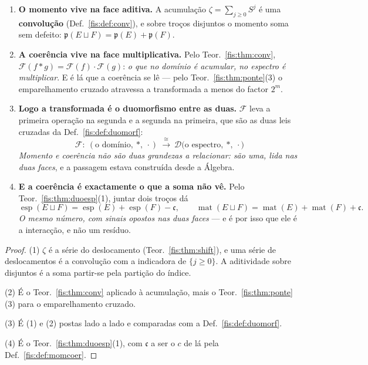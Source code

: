 \documentclass[livro.tex]{subfiles}
\begin{document}
\begin{teorema}\label{fis:thm:momcoer}
\begin{enumerate}\itemsep3pt
\item[(1)] \textbf{O momento vive na face aditiva.} A acumulação
$\zeta=\sum_{j\ge0}S^{j}$ é uma \textbf{convolução} (Def.~\ref{fis:def:conv}), e
sobre troços disjuntos o momento soma sem defeito:
$\mathfrak{p}(E\sqcup F)=\mathfrak{p}(E)+\mathfrak{p}(F)$.
\item[(2)] \textbf{A coerência vive na face multiplicativa.} Pelo
Teor.~\ref{fis:thm:conv}, $\mathcal{F}(f*g)=\mathcal{F}(f)\cdot\mathcal{F}(g)$:
\emph{o que no domínio é acumular, no espectro é multiplicar}. E é lá que a
coerência se lê --- pelo Teor.~\ref{fis:thm:ponte}(3) o emparelhamento cruzado
atravessa a transformada a menos do factor $2^{m}$.
\item[(3)] \textbf{Logo a transformada é o duomorfismo entre as duas.}
$\mathcal{F}$ leva a primeira operação na segunda e a segunda na primeira, que
são as duas leis cruzadas da Def.~\ref{fis:def:duomorf}:
\[
\boxed{\;\mathcal{F}\colon\ (\text{o domínio},\ \ast,\ \cdot)\ \xrightarrow{\ \cong\ }\ \mathcal{D}\bigl(\text{o espectro},\ \ast,\ \cdot\bigr)\;}
\]
\emph{Momento e coerência não são duas grandezas a relacionar: são uma, lida nas
duas faces}, e a passagem estava construída desde a Álgebra.
\item[(4)] \textbf{E a coerência é exactamente o que a soma não vê.} Pelo
Teor.~\ref{fis:thm:duoesp}(1), juntar dois troços dá
\[
\operatorname{esp}(E\sqcup F)=\operatorname{esp}(E)+\operatorname{esp}(F)-\mathfrak{c},
\qquad
\operatorname{mat}(E\sqcup F)=\operatorname{mat}(E)+\operatorname{mat}(F)+\mathfrak{c}.
\]
\emph{O mesmo número, com sinais opostos nas duas faces} --- e é por isso que ele
é a interacção, e não um resíduo.
\end{enumerate}
\end{teorema}

\begin{proof}
(1) $\zeta$ é a série do deslocamento (Teor.~\ref{fis:thm:shift}), e uma série de
deslocamentos é a convolução com a indicadora de $\{j\ge0\}$. A aditividade sobre
disjuntos é a soma partir-se pela partição do índice.

(2) É o Teor.~\ref{fis:thm:conv} aplicado à acumulação, mais o
Teor.~\ref{fis:thm:ponte}(3) para o emparelhamento cruzado.

(3) É (1) e (2) postas lado a lado e comparadas com a Def.~\ref{fis:def:duomorf}.

(4) É o Teor.~\ref{fis:thm:duoesp}(1), com $\mathfrak{c}$ a ser o $c$ de lá pela
Def.~\ref{fis:def:momcoer}.
\end{proof}
\end{document}
